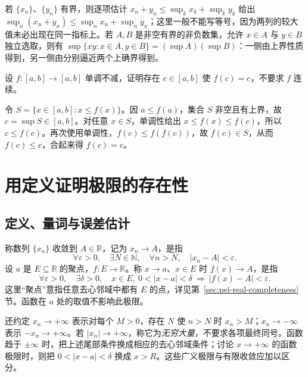 若 $\{x_n\}$、$\{y_n\}$ 有界，则逐项估计 $x_n+y_n\le\sup_kx_k+\sup_ky_k$ 给出 $\sup_n(x_n+y_n)\le\sup_nx_n+\sup_ny_n$；这里一般不能写等号，因为两列的较大值未必出现在同一指标上。若 $A,B$ 是非空有界的非负数集，允许 $x\in A$ 与 $y\in B$ 独立选取，则有 $\sup\{xy:x\in A,y\in B\}=(\sup A)(\sup B)$：一侧由上界性质得到，另一侧由分别逼近两个上确界得到。

\begin{example}
\label{ex:pei-monotone-fixed-point}
设 $f:[a,b]\to[a,b]$ 单调不减，证明存在 $c\in[a,b]$ 使 $f(c)=c$，不要求 $f$ 连续。
\end{example}
\begin{solve}
令 $S=\{x\in[a,b]:x\le f(x)\}$。因 $a\le f(a)$，集合 $S$ 非空且有上界，故 $c=\sup S\in[a,b]$。对任意 $x\in S$，单调性给出 $x\le f(x)\le f(c)$，所以 $c\le f(c)$。再次使用单调性，$f(c)\le f(f(c))$，故 $f(c)\in S$，从而 $f(c)\le c$，合起来得 $f(c)=c$。
\end{solve}

\section{用定义证明极限的存在性}
\label{sec:pei-limit-existence}

\subsection{定义、量词与误差估计}

\begin{definition}
\label{def:pei-sequence-limit}
称数列 $\{x_n\}$ 收敛到 $A\in\mathbb{R}$，记为 $x_n\to A$，是指
\[
    \forall\varepsilon>0,\quad\exists N\in\mathbb{N},\quad
    \forall n>N,\quad |x_n-A|<\varepsilon.
\]
设 $a$ 是 $E\subseteq\mathbb{R}$ 的聚点，$f:E\to\mathbb{R}$。称 $x\to a$、$x\in E$ 时 $f(x)\to A$，是指
\[
    \forall\varepsilon>0,\quad\exists\delta>0,\quad
    x\in E,\ 0<|x-a|<\delta\ \Longrightarrow\ |f(x)-A|<\varepsilon.
\]
这里“聚点”意指任意去心邻域中都有 $E$ 的点，详见第~\ref{sec:pei-real-completeness} 节。函数在 $a$ 处的取值不影响此极限。
\end{definition}

还约定 $x_n\to+\infty$ 表示对每个 $M>0$，存在 $N$ 使 $n>N$ 时 $x_n>M$；$x_n\to-\infty$ 表示 $-x_n\to+\infty$。若 $|x_n|\to+\infty$，称它为\emph{无穷大量}，不要求各项最终同号。函数趋于 $\pm\infty$ 时，把上述尾部条件换成相应的去心邻域条件；讨论 $x\to+\infty$ 的函数极限时，则把 $0<|x-a|<\delta$ 换成 $x>R$。这些广义极限与有限收敛应加以区分。

